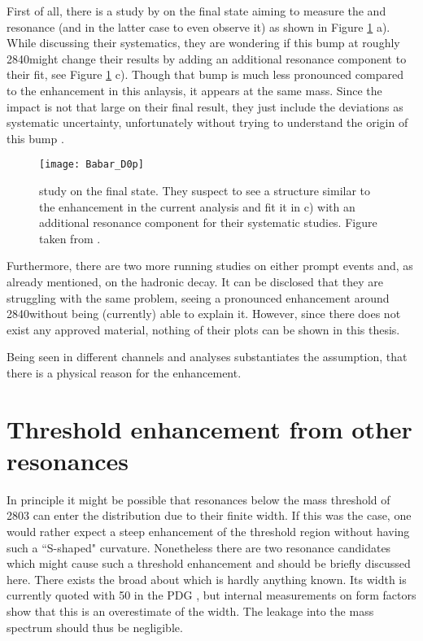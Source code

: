 First of all, there is a study by \babar on the \Dz\proton final state aiming to measure the \LcResI and \LcResII resonance (and in the latter case to even observe it) as shown in Figure \ref{fig:Babar_D0p} a).
While discussing their systematics, they are wondering if this bump at roughly 2840\mev might change their results by adding an additional resonance component to their fit, see Figure \ref{fig:Babar_D0p} c).
Though that bump is much less pronounced compared to the enhancement in this anlaysis, it appears at the same mass.
Since the impact is not that large on their final result, they just include the deviations as systematic uncertainty, unfortunately without trying to understand the origin of this bump \cite{BaBar_D0p}.
\begin{figure}[hptb]
	\centering
	\texttt{[image: Babar\_D0p]}
	\caption{\babar study on the \Dz\proton final state. They suspect to see a structure similar to the enhancement in the current analysis and fit it in c) with an additional resonance component for their systematic studies. Figure taken from \cite{BaBar_D0p}.}
	\label{fig:Babar_D0p}
\end{figure}

Furthermore, there are two more running \lhcb studies on either prompt \Dz\proton events and, as already mentioned, on the hadronic \decay{\Lb}{\Dz\proton\pim} decay.
It can be disclosed that they are struggling with the same problem, seeing a pronounced enhancement around 2840\mev without being (currently) able to explain it.
However, since there does not exist any approved material, nothing of their plots can be shown in this thesis.

Being seen in different channels and analyses substantiates the assumption, that there is a physical reason for the enhancement.

\section{Threshold enhancement from other resonances}
In principle it might be possible that resonances below the \Dz\proton mass threshold of 2803 \mev can enter the distribution due to their finite width.
If this was the case, one would rather expect a steep enhancement of the threshold region without having such a ``S-shaped" curvature.
Nonetheless there are two resonance candidates which might cause such a threshold enhancement and should be briefly discussed here.
There exists the broad  about which is hardly anything known.
Its width is currently quoted with 50 \mev in the PDG \cite{PDG}, but internal \lhcb measurements on \Lb form factors show that this is an overestimate of the  width.
The leakage into the \Dz\proton mass spectrum should thus be negligible.

